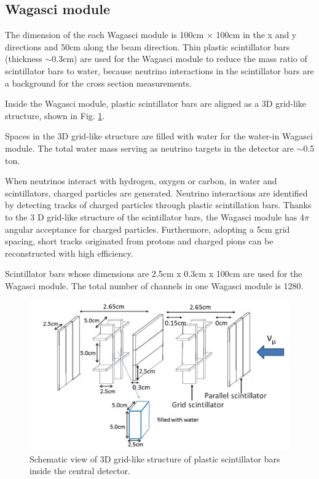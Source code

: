 \subsection{Wagasci module}
The dimension of the each Wagasci module is 100cm $\times$ 100cm in the x and y directions
and 50cm along the beam direction.
Thin plastic scintillator bars (thickness $\sim 0.3$cm) are used for the Wagasci module
to reduce  the mass ratio of scintillator bars to water,
because neutrino interactions in the scintillator bars are a background for the cross section measurements.

Inside the Wagasci module, plastic scintillator bars are aligned as a 3D grid-like structure, shown in Fig. \ref{fig:3dgrid}.


Spaces in the 3D grid-like structure are filled with water for the water-in Wagasci module.
The total water mass serving as neutrino targets in the detector are $\sim$0.5 ton.

When neutrinos interact with hydrogen, oxygen or carbon, in water and scintillators,
charged particles are generated.
Neutrino interactions are identified by detecting tracks of charged particles through plastic scintillation bars.
Thanks to the 3 D grid-like structure of the scintillator bars, 
the Wagasci module has $4\pi$ angular acceptance for charged particles.
Furthermore, adopting a 5cm grid spacing, short tracks originated from protons and charged pions can be reconstructed
with high efficiency.

Scintillator bars whose dimensions are 2.5cm x 0.3cm x 100cm are used for the Wagasci module.
The total number of channels in one Wagasci module is 1280.

\begin{figure}[tbh]
\begin{center}
\includegraphics[width=1.0\linewidth]{fig/3d_grid_structure.pdf}
\end{center}
\caption{
Schematic view of 3D grid-like structure of plastic scintillator bars inside the central detector.
}
\label{fig:3dgrid}
\end{figure}


